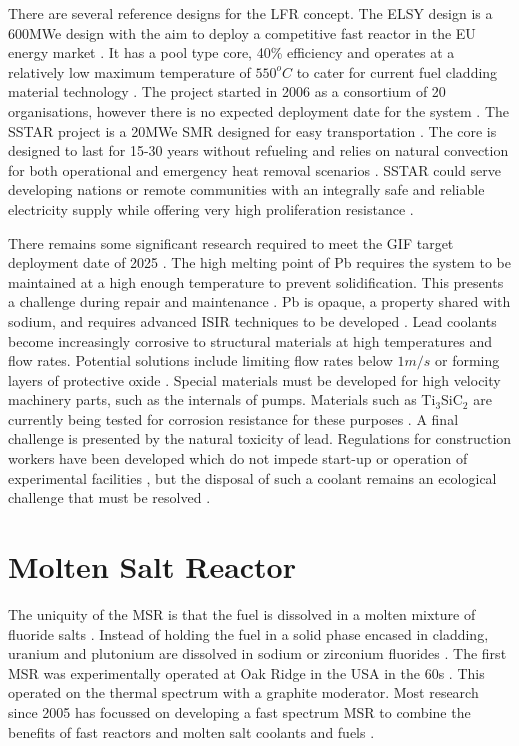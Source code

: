\documentclass[journal]{IEEEtran}
\begin{document}
There are several reference designs for the LFR concept.
The ELSY design is a 600MWe design with the aim to deploy a competitive fast reactor in the EU energy market \cite{Locatelli2013}.
It has a pool type core, 40\% efficiency and operates at a relatively low maximum temperature of $550^{o}C$ to cater for current fuel cladding material technology \cite{Int2012}.
The project started in 2006 as a consortium of 20 organisations, however there is no expected deployment date for the system \cite{GenIVForum}.
The SSTAR project is a 20MWe SMR designed for easy transportation \cite{GenIVForum}.
The core is designed to last for 15-30 years without refueling and relies on natural convection for both operational and emergency heat removal scenarios \cite{Int2012}.
SSTAR could serve developing nations or remote communities with an integrally safe and reliable electricity supply while offering very high proliferation resistance \cite{Int2012}.

There remains some significant research required to meet the GIF target deployment date of 2025 \cite{GenIVRoadmap}.
The high melting point of Pb requires the system to be maintained at a high enough temperature to prevent solidification. 
This presents a challenge during repair and maintenance \cite{GenIVForum}.
Pb is opaque, a property shared with sodium, and requires advanced ISIR techniques to be developed \cite{GenIVForum}.
Lead coolants become increasingly corrosive to structural materials at high temperatures and flow rates.
Potential solutions include limiting flow rates below $1m/s$ or forming layers of protective oxide \cite{Int2012}.
Special materials must be developed for high velocity machinery parts, such as the internals of pumps.
Materials such as Ti$_3$SiC$_2$ are currently being tested for corrosion resistance for these purposes \cite{Int2012}.
A final challenge is presented by the natural toxicity of lead.
Regulations for construction workers have been developed which do not impede start-up or operation of experimental facilities \cite{Int2012}, but the disposal of such a coolant remains an ecological challenge that must be resolved \cite{Locatelli2013}.



\section{Molten Salt Reactor}
The uniquity of the MSR is that the fuel is dissolved in a molten mixture of fluoride salts \cite{GenIVRoadmap}.
Instead of holding the fuel in a solid phase encased in cladding, uranium and plutonium are dissolved in sodium or zirconium fluorides \cite{Marques2010a}.
The first MSR was experimentally operated at Oak Ridge in the USA in the 60s \cite{Marques2010a}.
This operated on the thermal spectrum with a graphite moderator.
Most research since 2005 has focussed on developing a fast spectrum MSR to combine the benefits of fast reactors and molten salt coolants and fuels \cite{GenIVForum}.
\end{document}
